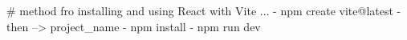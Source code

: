 # method fro installing and using React with Vite ...
- {npm create vite@latest}
- then \cd --> project_name
- {npm install}
- npm run dev
